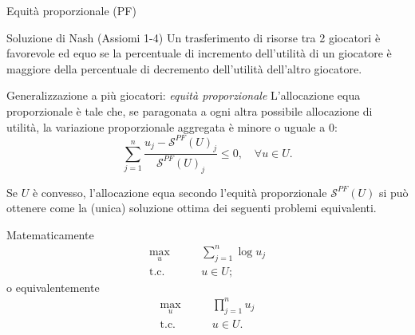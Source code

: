 \documentclass{beamer}
\begin{document}
\begin{frame}{Equità proporzionale (PF)}
	\begin{block}{Soluzione di Nash (Assiomi 1-4)}
		Un trasferimento di risorse tra 2 giocatori è favorevole ed equo se la percentuale di incremento dell'utilità di un giocatore è maggiore della percentuale di decremento dell'utilità dell'altro giocatore.
	\end{block}
	\begin{block}{	Generalizzazione a più giocatori: \textit{equità proporzionale} }
		L'allocazione equa proporzionale è tale che, se paragonata a ogni altra possibile allocazione di utilità, la variazione proporzionale aggregata è minore o uguale a $0$:
		\vspace{-0.3cm}
		\begin{equation}
			\sum_{j=1}^n \frac{u_j - \mathcal{S}^{PF}(U)_j}{\mathcal{S}^{PF}(U)_j} \le 0, 	\quad \forall u \in U.
		\end{equation}
		\vspace{-0.5cm}
	\end{block}
\end{frame}

\begin{frame}
	Se $U$ è convesso, l'allocazione equa secondo l'equità proporzionale $\mathcal{S}^{PF}(U)$ si può ottenere come la (unica) soluzione ottima dei seguenti problemi equivalenti.
	\begin{block}{Matematicamente}
		\vspace{-0.6cm}
		\begin{equation}
			\begin{split}
				\underset{u}{\text{max}} & \qquad \sum_{j=1}^n \log{u_j} \\
				\text{t.c.} & \qquad u \in U;
			\end{split}
		\end{equation}
		o equivalentemente
		\vspace{-0.3cm}
		\begin{equation}
			\begin{split}
				\underset{u}{\text{max}} & \qquad \prod_{j=1}^n u_j \\
				\text{t.c.} & \qquad u \in U.
			\end{split}
		\end{equation}
		\vspace{-0.3cm}
	\end{block}
\end{frame}

\end{document}
